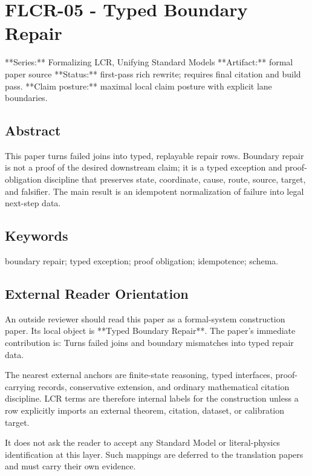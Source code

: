 \documentclass[11pt]{article}
\begin{document}
\section*{FLCR-05 - Typed Boundary Repair}

**Series:** Formalizing LCR, Unifying Standard Models
**Artifact:** formal paper source
**Status:** first-pass rich rewrite; requires final citation and build pass.
**Claim posture:** maximal local claim posture with explicit lane boundaries.

\subsection*{Abstract}

This paper turns failed joins into typed, replayable repair rows. Boundary repair is not a proof of the desired downstream claim; it is a typed exception and proof-obligation discipline that preserves state, coordinate, cause, route, source, target, and falsifier. The main result is an idempotent normalization of failure into legal next-step data.

\subsection*{Keywords}

boundary repair; typed exception; proof obligation; idempotence; schema.

\subsection*{External Reader Orientation}

An outside reviewer should read this paper as a formal-system construction paper. Its local object is **Typed Boundary Repair**. The paper's immediate contribution is: Turns failed joins and boundary mismatches into typed repair data.

The nearest external anchors are finite-state reasoning, typed interfaces, proof-carrying records, conservative extension, and ordinary mathematical citation discipline. LCR terms are therefore internal labels for the construction unless a row explicitly imports an external theorem, citation, dataset, or calibration target.

It does not ask the reader to accept any Standard Model or literal-physics identification at this layer. Such mappings are deferred to the translation papers and must carry their own evidence.
\end{document}
